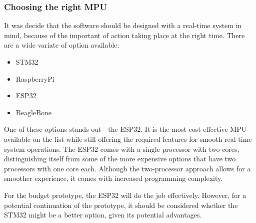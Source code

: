 \documentclass[../report.tex]{subfiles}
\begin{document}
    \subsubsection{Choosing the right MPU}
    It was decide that the software should be designed with a real-time system in
    mind, because of the important of action taking place at the right time.
    There are a wide variate of option available:
    \begin{itemize}
        \item STM32
        \item RaspberryPi
        \item ESP32
        \item BeagleBone
    \end{itemize} 
    One of these options stands out—the ESP32. It is the most cost-effective
    MPU available on the list while still offering the required features for
    smooth real-time system operations. The ESP32 comes with a single processor
    with two cores, distinguishing itself from some of the more expensive
    options that have two processors with one core each. Although the
    two-processor approach allows for a smoother experience, it comes with
    increased programming complexity.

    For the budget prototype, the ESP32 will do the job effectively. However,
    for a potential continuation of the prototype, it should be considered
    whether the STM32 might be a better option, given its potential advantages.
\end{document}
